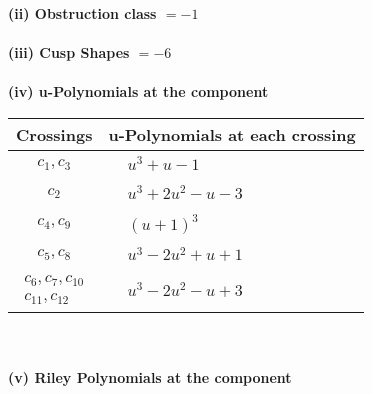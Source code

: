 \documentclass[1p]{elsarticle_modified}
\theoremstyle{definition}
\begin{document}
\flushleft \textbf{(ii) Obstruction class $= -1$}\\~\\
\flushleft \textbf{(iii) Cusp Shapes $= -6$}\\~\\
\newpage\renewcommand{\arraystretch}{1}
\flushleft \textbf{(iv) u-Polynomials at the component}\newline \\
\begin{tabular}{m{50pt}|m{274pt}}
Crossings & \hspace{64pt}u-Polynomials at each crossing \\
\hline $$\begin{aligned}c_{1},c_{3}\end{aligned}$$&$\begin{aligned}
&u^3+u-1
\end{aligned}$\\
\hline $$\begin{aligned}c_{2}\end{aligned}$$&$\begin{aligned}
&u^3+2 u^2- u-3
\end{aligned}$\\
\hline $$\begin{aligned}c_{4},c_{9}\end{aligned}$$&$\begin{aligned}
&(u+1)^3
\end{aligned}$\\
\hline $$\begin{aligned}c_{5},c_{8}\end{aligned}$$&$\begin{aligned}
&u^3-2 u^2+u+1
\end{aligned}$\\
\hline $$\begin{aligned}c_{6},c_{7},c_{10}\\c_{11},c_{12}\end{aligned}$$&$\begin{aligned}
&u^3-2 u^2- u+3
\end{aligned}$\\
\hline
\end{tabular}\\~\\
\newpage\renewcommand{\arraystretch}{1}
\flushleft \textbf{(v) Riley Polynomials at the component}\newline \\
\end{document}
